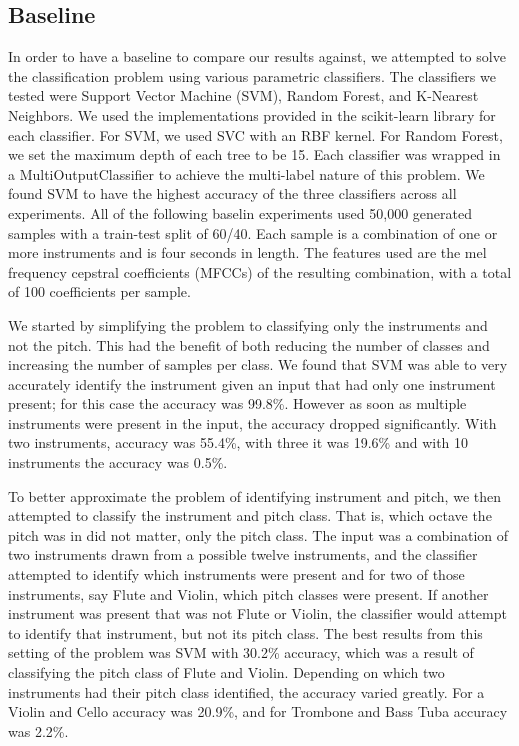 \documentclass{article}
\begin{document}
\subsection{Baseline}
In order to have a baseline to compare our results against, we attempted to solve the classification problem using various parametric classifiers. The classifiers we tested were Support Vector Machine (SVM), Random Forest, and K-Nearest Neighbors. We used the implementations provided in the scikit-learn library for each classifier. For SVM, we used SVC with an RBF kernel. For Random Forest, we set the maximum depth of each tree to be 15. Each classifier was wrapped in a MultiOutputClassifier to achieve the multi-label nature of this problem. We found SVM to have the highest accuracy of the three classifiers across all experiments. All of the following baselin experiments used 50,000 generated samples with a train-test split of 60/40. Each sample is a combination of one or more instruments and is four seconds in length. The features used are the mel frequency cepstral coefficients (MFCCs) of the resulting combination, with a total of 100 coefficients per sample.

We started by simplifying the problem to classifying only the instruments and not the pitch. This had the benefit of both reducing the number of classes and increasing the number of samples per class. We found that SVM was able to very accurately identify the instrument given an input that had only one instrument present; for this case the accuracy was 99.8\%. However as soon as multiple instruments were present in the input, the accuracy dropped significantly. With two instruments, accuracy was 55.4\%, with three it was 19.6\% and with 10 instruments the accuracy was 0.5\%. 

To better approximate the problem of identifying instrument and pitch, we then attempted to classify the instrument and pitch class. That is, which octave the pitch was in did not matter, only the pitch class. The input was a combination of two instruments drawn from a possible twelve instruments, and the classifier attempted to identify which instruments were present and for two of those instruments, say Flute and Violin, which pitch classes were present. If another instrument was present that was not Flute or Violin, the classifier would attempt to identify that instrument, but not its pitch class. The best results from this setting of the problem was SVM with 30.2\% accuracy, which was a result of classifying the pitch class of Flute and Violin. Depending on which two instruments had their pitch class identified, the accuracy varied greatly. For a Violin and Cello accuracy was 20.9\%, and for Trombone and Bass Tuba accuracy was 2.2\%.
\end{document}
